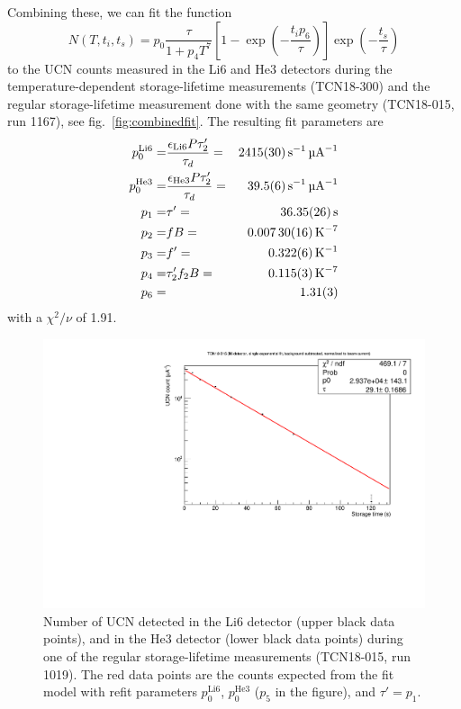 \documentclass[10pt,letterpaper]{article}
\begin{document}
Combining these, we can fit the function
\begin{equation}
N(T,t_i,t_s) = p_0 \frac{\tau}{1 + p_4 T^7}
    \left[ 1 - \exp \left( -\frac{t_i p_6}{\tau} \right) \right]
    \exp \left( -\frac{t_s}{\tau} \right)
\end{equation}
to the UCN counts measured in the Li6 and He3 detectors during the temperature-dependent storage-lifetime measurements (TCN18-300) and the regular storage-lifetime measurement done with the same geometry (TCN18-015, run 1167), see fig.~\ref{fig:combinedfit}.
The resulting fit parameters are
\begin{eqnarray}
p_0^\mathrm{Li6} =& \frac{\epsilon_\mathrm{Li6} P \tau_2'}{\tau_d} =& \SI{2415+-30}{\per\second\per\micro\ampere} \\
p_0^\mathrm{He3} =& \frac{\epsilon_\mathrm{He3} P \tau_2'}{\tau_d} =& \SI{39.5+-0.6}{\per\second\per\micro\ampere} \\
p_1 =& \tau' =& \SI{36.35+-0.26}{\second} \\
p_2 =& f B =& \SI{0.00730+-0.00016}{\per\kelvin\tothe{7}} \\
p_3 =& f' =& \SI{0.322+-0.006}{\per\kelvin} \\
p_4 =& \tau_2' f_2 B =& \SI{0.115+-0.003}{\per\kelvin\tothe{7}} \\
p_6 =& & \num{1.31+-0.03}
\end{eqnarray}
with a $\chi^2/\nu$ of \num{1.91}.

\begin{figure}
\centering
\includegraphics[width=\textwidth,page=3]{../storagelifetime/TCN18-015_1019.pdf}
\caption{Number of UCN detected in the Li6 detector (upper black data points), and in the He3 detector (lower black data points) during one of the regular storage-lifetime measurements (TCN18-015, run 1019). The red data points are the counts expected from the fit model with refit parameters $p_0^\mathrm{Li6}$, $p_0^\mathrm{He3}$ ($p_5$ in the figure), and $\tau' = p_1$.}
\label{fig:storagelifetime_corrected}
\end{figure}
\end{document}
